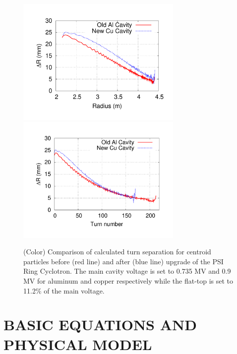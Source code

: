 \documentclass[aps,prstab,onecolumn,superscriptaddress,showpacs]{revtex4}
\begin{document}
    
  \begin{figure}
    {\includegraphics[width=8cm,trim=2.5cm 2.5cm 2.5cm 2.5cm]{figures/R_dR_Ring.pdf}}
    {\includegraphics[width=8cm,trim=2.5cm 2.5cm 2.5cm 2.5cm]{figures/Turn_dR_Ring.pdf}}
    \caption{(Color) Comparison of calculated turn separation for centroid particles before (red line) and after (blue line) upgrade of the PSI Ring Cyclotron.
      The main cavity voltage is set to 0.735 MV and 0.9\,MV for aluminum and copper respectively while the flat-top is set to 11.2$\%$ of the main voltage.}
    \label{fig:TuneSep}
  \end{figure}

\section{BASIC EQUATIONS AND PHYSICAL MODEL }
\end{document}
